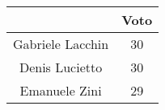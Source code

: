 \documentclass{article}
\begin{document}
\begin{center}
    \begin{tabular}{|c|c|}
        \hline
                         & Voto \\
        \hline
        Gabriele Lacchin & 30   \\
        \hline
        Denis Lucietto   & 30   \\
        \hline
        Emanuele Zini    & 29   \\
        \hline
    \end{tabular}
\end{center}
\end{document}
